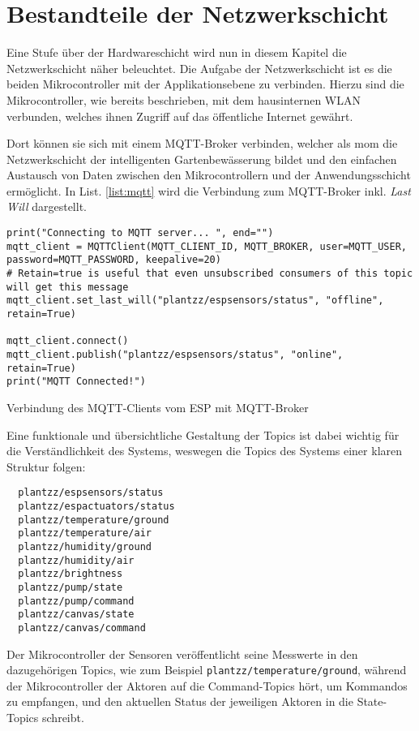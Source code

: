
\section{Bestandteile der Netzwerkschicht}

Eine Stufe über der Hardwareschicht wird nun in diesem Kapitel die Netzwerkschicht näher beleuchtet.
Die Aufgabe der Netzwerkschicht ist es die beiden Mikrocontroller mit der Applikationsebene zu verbinden.
Hierzu sind die Mikrocontroller, wie bereits beschrieben, mit dem hausinternen WLAN verbunden, welches ihnen Zugriff auf das öffentliche Internet gewährt.

Dort können sie sich mit einem MQTT-Broker verbinden, welcher als \gls{mom} die Netzwerkschicht der intelligenten Gartenbewässerung bildet und den einfachen Austausch von Daten zwischen den Mikrocontrollern und der Anwendungsschicht ermöglicht. In List. \ref{list:mqtt} wird die Verbindung zum MQTT-Broker inkl. \textit{Last Will} dargestellt.

\begin{listing}[!ht]
\begin{verbatim}
print("Connecting to MQTT server... ", end="")
mqtt_client = MQTTClient(MQTT_CLIENT_ID, MQTT_BROKER, user=MQTT_USER, password=MQTT_PASSWORD, keepalive=20)
# Retain=true is useful that even unsubscribed consumers of this topic will get this message
mqtt_client.set_last_will("plantzz/espsensors/status", "offline", retain=True)

mqtt_client.connect()
mqtt_client.publish("plantzz/espsensors/status", "online", retain=True)
print("MQTT Connected!")
\end{verbatim}
\caption{Verbindung des MQTT-Clients vom ESP mit MQTT-Broker}
\label{list:mqtt}
\end{listing}  

Eine funktionale und übersichtliche Gestaltung der Topics ist dabei wichtig für die Verständlichkeit des Systems, weswegen die Topics des Systems einer klaren Struktur folgen:

\begin{verbatim}
  plantzz/espsensors/status
  plantzz/espactuators/status
  plantzz/temperature/ground
  plantzz/temperature/air
  plantzz/humidity/ground
  plantzz/humidity/air
  plantzz/brightness
  plantzz/pump/state
  plantzz/pump/command
  plantzz/canvas/state
  plantzz/canvas/command
\end{verbatim}

Der Mikrocontroller der Sensoren veröffentlicht seine Messwerte in den dazugehörigen Topics, wie zum Beispiel \texttt{plantzz/temperature/ground}, während der Mikrocontroller der Aktoren auf die Command-Topics hört, um Kommandos zu empfangen, und den aktuellen Status der jeweiligen Aktoren in die State-Topics schreibt.

